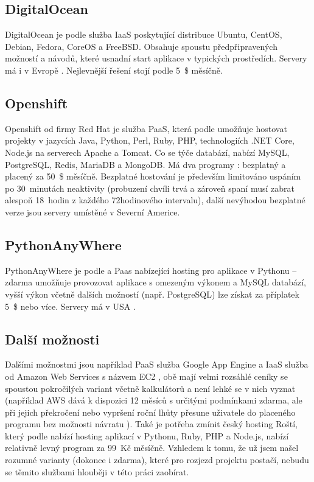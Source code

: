         \subsection{DigitalOcean}
        DigitalOcean je podle \cite{digitalocean1} služba IaaS poskytující distribuce Ubuntu, CentOS, Debian, Fedora, CoreOS a FreeBSD. Obsahuje spoustu předpřipravených možností a návodů, které usnadní start aplikace v typických prostředích. Servery má i v Evropě \cite{digitalocean2}. Nejlevnější řešení stojí podle \cite{digitalocean3} 5~\$ měsíčně.
        
        \subsection{Openshift}
        Openshift od firmy Red Hat je služba PaaS, která podle \cite{openshift1} umožňuje hostovat projekty v jazycích Java, Python, Perl, Ruby, PHP, technologiích .NET Core, Node.js na serverech Apache a Tomcat. Co se týče databází, nabízí MySQL, PostgreSQL, Redis, MariaDB a MongoDB. Má dva programy \cite{openshift2}: bezplatný a placený za 50~\$ měsíčně. Bezplatné hostování je především limitováno uspáním po 30~minutách neaktivity (probuzení chvíli trvá a zároveň spaní musí zabrat alespoň 18~hodin z každého 72hodinového intervalu), další nevýhodou bezplatné verze jsou servery umístěné v Severní Americe.
        
        \subsection{PythonAnyWhere}
        PythonAnyWhere je podle \cite{pythonanywhere1} a \cite{pythonanywhere2} Paas nabízející hosting pro aplikace v Pythonu -- zdarma umožňuje provozovat aplikace s omezeným výkonem a MySQL databází, vyšší výkon včetně dalších možností (např. PostgreSQL) lze získat za příplatek 5~\$ nebo více. Servery má v USA \cite{pythonanywhere3}.
        
        \subsection{Další možnosti}
        Dalšími možnostmi jsou například PaaS služba Google App Engine \cite{googleapp} a IaaS služba od Amazon Web Services s názvem EC2 \cite{aws1}, obě mají velmi rozsáhlé ceníky se spoustou pokročilých variant včetně kalkulátorů a není lehké se v nich vyznat (například AWS dává k dispozici 12 měsíců s určitými podmínkami zdarma, ale při jejich překročení nebo vypršení roční lhůty přesune uživatele do placeného programu bez možnosti návratu \cite{aws2}). Také je potřeba zmínit český hosting Roští, který podle \cite{rosti} nabízí hosting aplikací v Pythonu, Ruby, PHP a Node.js, nabízí relativně levný program za 99~Kč měsíčně. Vzhledem k tomu, že už jsem našel rozumné varianty (dokonce i zdarma), které pro rozjezd projektu postačí, nebudu se těmito službami hlouběji v této práci zaobírat.

